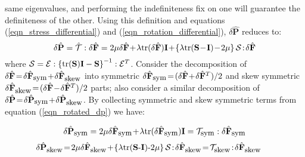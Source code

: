 same eigenvalues, and performing the indefiniteness fix on one will guarantee the definiteness of the other. Using this definition and equations (\ref{eqn_stress_differential}) and
(\ref{eqn_rotation_differential}), $\delta\hat{\mathbf{P}}$ reduces to:
\begin{equation}
\delta\hat{\mathbf{P}}=\hat{\mathcal{T}}:\delta\hat{\mathbf{F}}=
2\mu\delta\hat{\mathbf{F}}\!+\!\lambda\tr(\delta\hat{\mathbf{F}})\mathbf{I}\!+\!\left\{\lambda\tr(\mathbf{S}\!-\!\mathbf{I})\!-\!2\mu\right\}\mathcal{S}\!:\!\delta\hat{\mathbf{F}}
\label{eqn_rotated_dp}
\end{equation}
where $\mathcal{S}=\mathcal{E}:\left\{\mbox{tr}(\mathbf{S})\mathbf{I}-\mathbf{S}\right\}^{-1}:\mathcal{E}^T$. Consider the decomposition of
$\delta\hat{\mathbf{F}}\!=\!\delta\hat{\mathbf{F}}_{\mbox{\small sym}}\!+\!\delta\hat{\mathbf{F}}_{\mbox{\small skew}}$ into symmetric 
$\delta\hat{\mathbf{F}}_{\mbox{\small sym}}\!=\!(\delta\hat{\mathbf{F}}\!+\!\delta\hat{\mathbf{F}}^T)/2$ and skew symmetric
$\delta\hat{\mathbf{F}}_{\mbox{\small skew}}\!=\!(\delta\hat{\mathbf{F}}\!-\!\delta\hat{\mathbf{F}}^T)/2$ parts; also consider a similar decomposition of 
$\delta\hat{\mathbf{P}}\!=\!\delta\hat{\mathbf{P}}_{\mbox{\small sym}}\!+\!\delta\hat{\mathbf{P}}_{\mbox{\small skew}}$. By collecting symmetric and skew symmetric terms from equation
(\ref{eqn_rotated_dp}) we have:

\begin{equation}
\delta\hat{\mathbf{P}}_{\mbox{\small sym}}=2\mu\delta\hat{\mathbf{F}}_{\mbox{\small sym}}\!+\!\lambda\mbox{tr}(\delta\hat{\mathbf{F}}_{\mbox{\small sym}})\mathbf{I}=\mathcal{T}_{\mbox{\small sym}}:\delta\hat{\mathbf{F}}_{\mbox{\small sym}}
\label{eqn_dp_sym}
\end{equation}
\begin{equation}
\hspace*{-.2in}\delta\hat{\mathbf{P}}_{\mbox{\small skew}}
\!=\!2\mu\delta\hat{\mathbf{F}}_{\mbox{\small skew}}\!+\!\left\{\lambda\tr(\mathbf{S}\mbox{-}\mathbf{I})\mbox{-}2\mu\right\}\mathcal{S}\!:\!\delta\hat{\mathbf{F}}_{\mbox{\small skew}}
\!=\!\mathcal{T}_{\mbox{\small skew}}\!:\!\delta\hat{\mathbf{F}}_{\mbox{\small skew}}
\label{eqn_dp_skew}
\end{equation}

